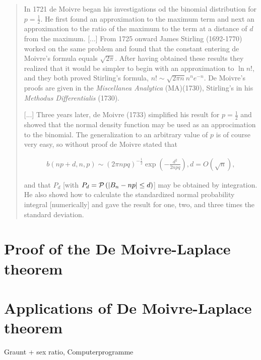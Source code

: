 \begin{quotation}
  In 1721 de Moivre began his investigations od the binomial distribution for $p=\tfrac 12$. He first found an approximation to the maximum term and next an approximation to the ratio of the maximum to the term at a distance of $d$ from the maximum. [...] From 1725 onward James Stirling (1692-1770) worked on the same problem and found that the constant entering de Moivre's formula equals $\sqrt{2\pi}$. After having obtained these results they realized that it would be simpler to begin with an approximation to $\ln n!$, and they both proved Stirling's formula, $n! \sim \sqrt{2\pi n}n^ne^{-n}$. De Moivre's proofs are given in the \emph{Miscellanea Analytica} (MA)(1730), Stirling's in his \emph{Methodus Differentialis} (1730).

  [...] Three years later, de Moivre (1733) simplified his result for $p=\tfrac 12$ and showed that the normal density function may be used as an approcimation to the binomial. The generalization to an arbitrary value of $p$ is of course very easy, so without proof de Moivre stated that

  \begin{align*}
      b(np+d,n,p) \sim (2\pi npq)^{-\tfrac 12} \exp\left( -\frac{d^2}{2npq} \right), d = O(\sqrt n),
  \end{align*}

  and that $P_d$ [with $P_d=\mathcal P\left({|B_{n} -np|\le d}\right)$] may be obtained by integration. He also showd how to calculate the standardized normal probability integral [numerically] and gave the result for one, two, and three times the standard deviation.
\end{quotation}

\section{Proof of the De Moivre-Laplace theorem}

\section{Applications of De Moivre-Laplace theorem}

Graunt + sex ratio, Computerprogramme
